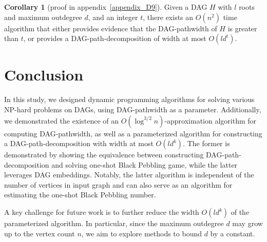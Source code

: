 \documentclass[runningheads]{llncs}
\theoremstyle{plain}
\newtheorem{cor}{Corollary}
\theoremstyle{definition}
\newtheorem{cor}{Corollary}
\begin{document}
\begin{cor}[proof in appendix~\ref{appendix_D9}]\label{cor}
    Given a DAG $H$ with $l$ roots and maximum outdegree $d$, and an integer $t$, there exists an $O(n^2)$ time algorithm that either provides evidence that the DAG-pathwidth of $H$ is greater than $t$, or provides a DAG-path-decomposition of width at most $O(ld^t)$.
\end{cor}








































\section{Conclusion}

In this study, we designed dynamic programming algorithms for solving various NP-hard problems on DAGs, using DAG-pathwidth as a parameter. Additionally, we demonstrated the existence of an $O(\log^{3/2} n)$-approximation algorithm for computing DAG-pathwidth, as well as a parameterized algorithm for constructing a DAG-path-decomposition with width at most $O(ld^k)$. The former is demonstrated by showing the equivalence between constructing DAG-path-decomposition and solving one-shot Black Pebbling game, while the latter leverages DAG embeddings. Notably, the latter algorithm is independent of the number of vertices in input graph and can also serve as an algorithm for estimating the one-shot Black Pebbling number.

A key challenge for future work is to further reduce the width $O(ld^k)$ of the parameterized algorithm. In particular, since the maximum outdegree $d$ may grow up to the vertex count $n$, we aim to explore methods to bound $d$ by a constant.
\end{document}
